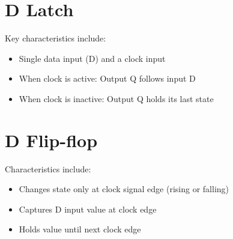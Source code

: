 \documentclass[12pt]{report}
\begin{document}
\section{D Latch}
 Key characteristics include:
\begin{itemize}
    \item Single data input (D) and a clock input
    \item When clock is active: Output Q follows input D
    \item When clock is inactive: Output Q holds its last state
\end{itemize}

\section{D Flip-flop}
 Characteristics include:
\begin{itemize}
    \item Changes state only at clock signal edge (rising or falling)
    \item Captures D input value at clock edge
    \item Holds value until next clock edge
\end{itemize}
\end{document}

